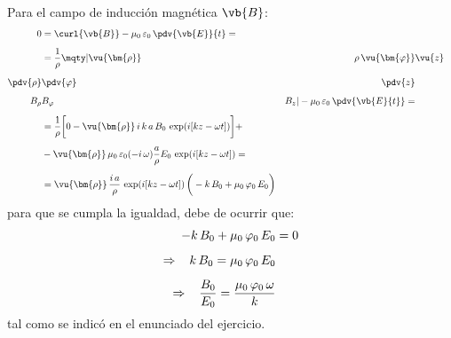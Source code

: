\noindent
Para el campo de inducción magnética $\vb{B}$:
\begin{align*}
0 &= \curl{\vb{B}} - \mu_{0} \, \varepsilon_{0} \, \pdv{\vb{E}}{t} = \\[0.5em]
&= \dfrac{1}{\rho} \mqty|
\vu{\bm{\rho}} & \rho \, \vu{\bm{\varphi}} & \vu{z} \\[0.5em]
\displaystyle \pdv{\rho} & \displaystyle  \pdv{\varphi} & \displaystyle \pdv{z} \\[0.5em]
B_{\rho} & B_{\varphi} & B_{z} | - \mu_{0} \, \varepsilon_{0} \, \pdv{\vb{E}{t}} = \\[0.5em]
&= \dfrac{1}{\rho} \bigg[ 0 - \vu{\bm{\rho}} \, i \, k \, a \, B_{0} \, \exp(i [k z - \omega t]) \bigg] + \\[0.5em]
&- \vu{\bm{\rho}} \, \mu_{0} \, \varepsilon_{0} (- i \, \omega) \dfrac{a}{\rho} E_{0} \, \exp(i [k z - \omega t]) = \\[0.5em]
&= \vu{\bm{\rho}} \, \dfrac{i \, a}{\rho} \, \exp(i [k z - \omega t]) \, \bigg( - k \, B_{0} + \mu_{0} \, \varphi_{0} \, E_{0} \bigg)
\end{align*}
para que se cumpla la igualdad, debe de ocurrir que:
\begin{align*}
- k \, B_{0} + \mu_{0} \, \varphi_{0} \, E_{0} &= 0 \\[0.5em]
\Rightarrow \hspace{0.3cm} k \, B_{0} = \mu_{0} \, \varphi_{0} \, E_{0} \\[0.5em]
\Rightarrow \hspace{0.3cm} \dfrac{B_{0}}{E_{0}} = \dfrac{\mu_{0} \, \varphi_{0} \, \omega}{k}
\end{align*}
tal como se indicó en el enunciado del ejercicio.
